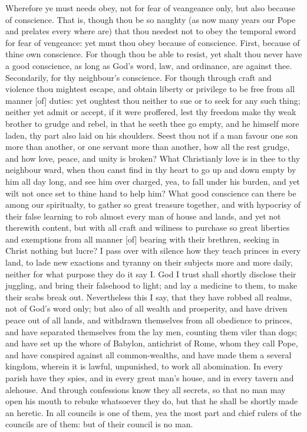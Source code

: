 Wherefore ye must needs obey, not for fear of veangeance 
only, but also because of conscience. That is, though 
thou be so naughty (as now many years our Pope and 
prelates every where are) that thou needest not to obey the 
temporal sword for fear of vengeance: yet must thou obey 
because of conscience. First, because of thine own conscience.
For though thou be able to resist, yet shalt thou 
never have a good conscience, as long as God's word, law,
and ordinance, are against thee. Secondarily, for thy 
neighbour's conscience. For though through craft and 
violence thou mightest escape, and obtain liberty or privilege
to be free from all manner [of] duties: yet oughtest 
thou neither to sue or to seek for any such thing; neither 
yet admit or accept, if it were proffered, lest thy freedom 
make thy weak brother to grudge and rebel, in that he 
seeth thee go empty, and he himself more laden, thy part 
also laid on his shoulders. Seest thou not if a man favour 
one son more than another, or one servant more than 
another, how all the rest grudge, and how love, peace, and 
unity is broken? What Christianly love is in thee to thy 
neighbour ward, when thou canst find in thy heart to go 
up and down empty by him all day long, and see him over 
charged, yea, to fall under his burden, and yet wilt not 
once set to thine hand to help him? What good conscience 
can there be among our spiritualty, to gather so great 
treasure together, and with hypocrisy of their false learning 
to rob almost every man of house and lands, and yet not 
therewith content, but with all craft and wiliness to purchase 
so great liberties and exemptions from all manner [of] bearing 
with their brethren, seeking in Christ nothing but lucre?
I pass over with silence how they teach princes in every 
land, to lade new exactions and tyranny on their subjects 
more and more daily, neither for what purpose they do it 
say I. God I trust shall shortly disclose their juggling, 
and bring their falsehood to light; and lay a medicine to 
them, to make their scabs break out. Nevertheless this I 
say, that they have robbed all realms, not of God's word 
only; but also of all wealth and prosperity, and have driven 
peace out of all lands, and withdrawn themselves from all 
obedience to princes, and have separated themselves from 
the lay men, counting them viler than dogs; and have set 
up the whore of Babylon, antichrist of Rome, whom they 
call Pope, and have conspired against all common-wealths, 
and have made them a several kingdom, wherein it is 
lawful, unpunished, to work all abomination. In every 
parish have they spies, and in every great man's house, and 
in every tavern and alehouse. And through confessions 
know they all secrets, so that no man may open his mouth 
to rebuke whatsoever they do, but that he shall be shortly 
made an heretic. In all councils is one of them, yea the 
most part and chief rulers of the councils are of them:
but of their council is no man. 

